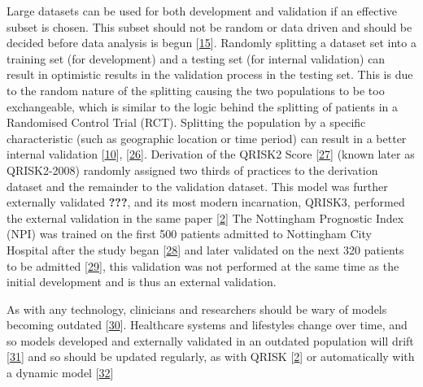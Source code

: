 \documentclass[12pt,PhD,twoside,openright]{muthesis}
\begin{document}
Large datasets can be used for both development and validation if an effective subset is chosen. This subset should not be random or data driven and should be decided before data analysis is begun {[}\protect\hyperlink{ref-riley_external_2016}{15}{]}. Randomly splitting a dataset set into a training set (for development) and a testing set (for internal validation) can result in optimistic results in the validation process in the testing set. This is due to the random nature of the splitting causing the two populations to be too exchangeable, which is similar to the logic behind the splitting of patients in a Randomised Control Trial (RCT). Splitting the population by a specific characteristic (such as geographic location or time period) can result in a better internal validation {[}\protect\hyperlink{ref-altman_prognosis_2009}{10}{]}, {[}\protect\hyperlink{ref-ivanov_predictive_2000}{26}{]}. Derivation of the QRISK2 Score {[}\protect\hyperlink{ref-hippisley-cox_derivation_2007}{27}{]} (known later as QRISK2-2008) randomly assigned two thirds of practices to the derivation dataset and the remainder to the validation dataset. This model was further externally validated {\textbf{???}}, and its most modern incarnation, QRISK3, performed the external validation in the same paper {[}\protect\hyperlink{ref-hippisley-cox_development_2017}{2}{]} The Nottingham Prognostic Index (NPI) was trained on the first 500 patients admitted to Nottingham City Hospital after the study began {[}\protect\hyperlink{ref-haybittle_prognostic_1982}{28}{]} and later validated on the next 320 patients to be admitted {[}\protect\hyperlink{ref-todd_confirmation_1987}{29}{]}, this validation was not performed at the same time as the initial development and is thus an external validation.

As with any technology, clinicians and researchers should be wary of models becoming outdated {[}\protect\hyperlink{ref-pate_uncertainty_2019}{30}{]}. Healthcare systems and lifestyles change over time, and so models developed and externally validated in an outdated population will drift {[}\protect\hyperlink{ref-bhatnagar_epidemiology_2015}{31}{]} and so should be updated regularly, as with QRISK {[}\protect\hyperlink{ref-hippisley-cox_development_2017}{2}{]} or automatically with a dynamic model {[}\protect\hyperlink{ref-jenkins_dynamic_2018}{32}{]}
\end{document}
